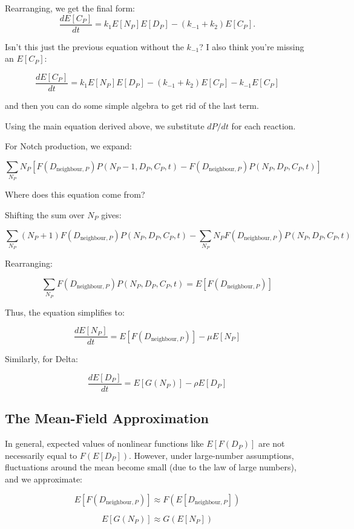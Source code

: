 \documentclass{article}
\begin{document}
Rearranging, we get the final form:
\[
\frac{dE[C_P]}{dt} = k_1 E[N_P]E[D_P] - (k_{-1} + k_2) E[C_P].
\]

\medskip
\color{red}
Isn't this just the previous equation without the $k_{-1}$? I also think you're missing an $E[C_{P}]$:

$$
\frac{dE[C_{P}]}{dt} = k_{1}E[N_{P}]E[D_{P}] - (k_{-1} + k_{2})E[C_{P}] - k_{-1}E[C_{P}]
$$

and then you can do some simple algebra to get rid of the last term.
\color{black}
\medskip


Using the main equation derived above, we substitute \( dP/dt \) for each reaction.

For Notch production, we expand:

\[
\sum_{N_P} N_P \left[ F(D_{\text{neighbour},P}) P(N_P - 1, D_P, C_P, t) - F(D_{\text{neighbour},P}) P(N_P, D_P, C_P, t) \right]
\]

\medskip
\color{red}
Where does this equation come from?
\color{black}
\medskip

Shifting the sum over \( N_P \) gives:

\[
\sum_{N_P} (N_P + 1) F(D_{\text{neighbour},P}) P(N_P, D_P, C_P, t) - \sum_{N_P} N_P F(D_{\text{neighbour},P}) P(N_P, D_P, C_P, t)
\]

Rearranging:

\[
\sum_{N_P} F(D_{\text{neighbour},P}) P(N_P, D_P, C_P, t) = E[F(D_{\text{neighbour},P})]
\]

Thus, the equation simplifies to:

\[
\frac{dE[N_P]}{dt} = E[F(D_{\text{neighbour},P})] - \mu E[N_P]
\]

Similarly, for Delta:

\[
\frac{dE[D_P]}{dt} = E[G(N_P)] - \rho E[D_P]
\]

\subsection{The Mean-Field Approximation}
In general, expected values of nonlinear functions like \( E[F(D_P)] \) are not necessarily equal to \( F(E[D_P]) \). However, under large-number assumptions, fluctuations around the mean become small (due to the law of large numbers), and we approximate:

\[
E[F(D_{\text{neighbour},P})] \approx F(E[D_{\text{neighbour},P}])
\]

\[
E[G(N_P)] \approx G(E[N_P])
\]
\end{document}
